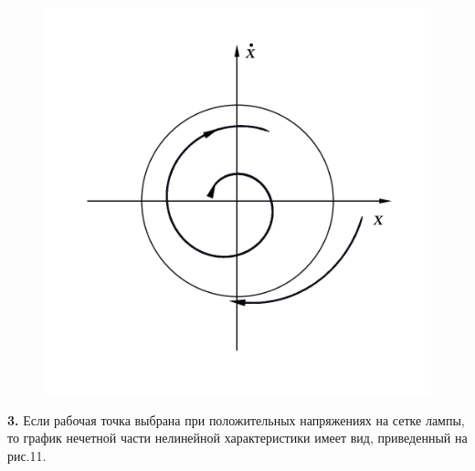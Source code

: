 \begin{center}
\begin{figure}[H]
\begin{minipage}{0.32\linewidth}
        \vspace{-30pt}
        \label{fig:11}
    \end{minipage}
    \begin{minipage}{0.32\linewidth}
        \includegraphics[width=\linewidth]{pics/Ris10c.png} 
        \vspace{-30pt}
        \label{fig:12}
    \end{minipage}
    \caption{}
    \vspace{-40pt}
    \end{figure}
\end{center} 

{\bfseries 3.} Если рабочая точка выбрана при положительных напряжениях на сетке лампы, то график нечетной части нелинейной характеристики имеет вид, приведенный на рис.11.

